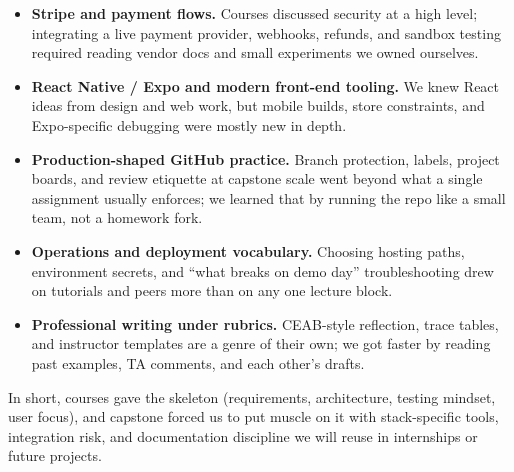 \documentclass{article}
\begin{document}
\begin{itemize}
  \item \textbf{Stripe and payment flows.} Courses discussed security at a high
        level; integrating a live payment provider, webhooks, refunds, and
        sandbox testing required reading vendor docs and small experiments we
        owned ourselves.
  \item \textbf{React Native / Expo and modern front-end tooling.} We knew React
        ideas from design and web work, but mobile builds, store
        constraints, and Expo-specific debugging were mostly new in depth.
  \item \textbf{Production-shaped GitHub practice.} Branch protection,
        labels, project boards, and review etiquette at capstone scale went
        beyond what a single assignment usually enforces; we learned that by
        running the repo like a small team, not a homework fork.
  \item \textbf{Operations and deployment vocabulary.} Choosing hosting paths,
        environment secrets, and ``what breaks on demo day'' troubleshooting drew
        on tutorials and peers more than on any one lecture block.
  \item \textbf{Professional writing under rubrics.} CEAB-style reflection,
        trace tables, and instructor templates are a genre of their own; we got
        faster by reading past examples, TA comments, and each other's drafts.
\end{itemize}

In short, courses gave the skeleton (requirements, architecture,
testing mindset, user focus), and capstone forced us to put muscle on it
with stack-specific tools, integration risk, and documentation discipline we will
reuse in internships or future projects.
\end{document}
